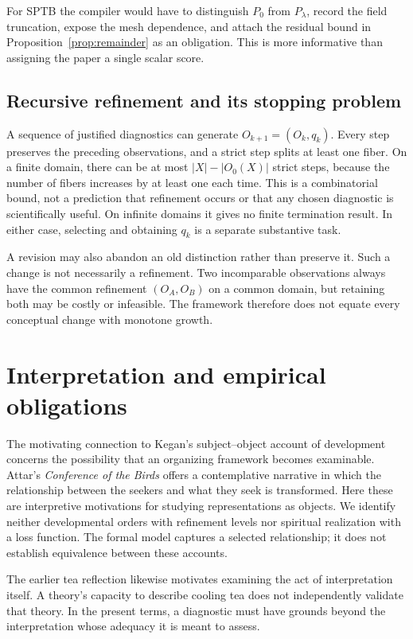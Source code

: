 \documentclass[11pt,letterpaper]{article}
\begin{document}
For SPTB the compiler would have to distinguish $P_0$ from $P_\lambda$,
record the field truncation, expose the mesh dependence, and attach
the residual bound in Proposition~\ref{prop:remainder} as an obligation.
This is more informative than assigning the paper a single scalar score.

\subsection{Recursive refinement and its stopping problem}
A sequence of justified diagnostics can generate
$O_{k+1}=(O_k,q_k)$. Every step preserves the preceding observations,
and a strict step splits at least one fiber. On a finite domain,
there can be at most $|X|-|O_0(X)|$ strict steps, because the number
of fibers increases by at least one each time. This is a combinatorial
bound, not a prediction that refinement occurs or that any chosen
diagnostic is scientifically useful. On infinite domains it gives
no finite termination result. In either case, selecting and obtaining
$q_k$ is a separate substantive task.

A revision may also abandon an old distinction rather than preserve
it. Such a change is not necessarily a refinement. Two incomparable
observations always have the common refinement $(O_A,O_B)$ on a common
domain, but retaining both may be costly or infeasible. The framework
therefore does not equate every conceptual change with monotone growth.

\section{Interpretation and empirical obligations}\label{sec:interpretation}
The motivating connection to Kegan's subject--object account of
development \cite{kegan} concerns the possibility that an organizing
framework becomes examinable. Attar's \emph{Conference of the Birds}
\cite{attar} offers a contemplative narrative in which the relationship
between the seekers and what they seek is transformed.
Here these are interpretive motivations for studying representations
as objects. We identify neither developmental orders with refinement
levels nor spiritual realization with a loss function. The formal
model captures a selected relationship; it does not establish
equivalence between these accounts.

The earlier tea reflection likewise motivates examining the act of
interpretation itself. A theory's capacity to describe cooling tea
does not independently validate that theory. In the present terms,
a diagnostic must have grounds beyond the interpretation whose
adequacy it is meant to assess.
\end{document}

